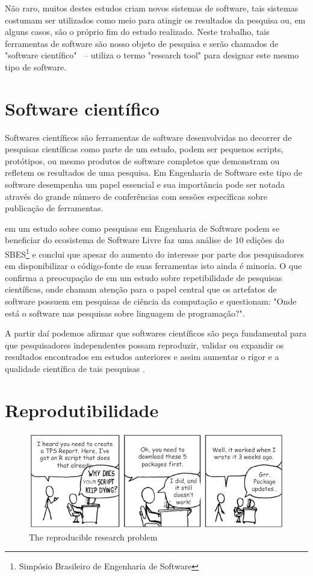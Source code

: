 \documentclass[qual, classic, a4paper]{ufbathesis}
\begin{document}
Não raro, muitos destes estudos criam novos sistemas de software, tais
sistemas costumam ser utilizados como meio para atingir os resultados da
pesquisa ou, em alguns casos, são o próprio fim do estudo realizado. Neste
trabalho, tais ferramentas de software são nosso objeto de pesquisa e serão
chamados de "software científico" \ --  utiliza o termo
"research tool" para designar este mesmo tipo de software.

\section{Software científico}

Softwares científicos são ferramentas de software desenvolvidas no decorrer de
pesquisas científicas como parte de um estudo, podem ser pequenos scripts,
protótipos, ou mesmo produtos de software completos que demonstram ou refletem
os resultados de uma pesquisa. Em Engenharia de Software este tipo de software
desempenha um papel essencial e sua importância pode ser notada através do
grande número de conferências com sessões específicas sobre publicação de
ferramentas.

 em um estudo sobre como pesquisas em Engenharia de
Software podem se beneficiar do ecosistema de Software Livre faz uma análise
de 10 edições do SBES\footnote{Simpósio Brasileiro de Engenharia de Software}
e conclui que apesar do aumento do interesse por parte dos pesquisadores em
disponibilizar o código-fonte de suas ferramentas isto ainda é minoria. O
que confirma a preocupação de  em um estudo
sobre repetibilidade de pesquisas científicas, onde chamam atenção para o papel
central que os artefatos de software possuem em pesquisas de ciência da
computação e questionam: "Onde está o software nas pesquisas sobre linguagem
de programação?".

A partir daí podemos afirmar que softwares científicos são peça fundamental
para que pesquisadores independentes possam reproduzir, validar ou expandir os
resultados encontrados em estudos anteriores e assim aumentar o rigor e a
qualidade científica de tais pesquisas \cite{Vitek2011}.

\section{Reprodutibilidade}

\begin{figure}[h]
  \center
  \includegraphics[scale=0.5]{imagens/reproducible-r-toolkit-cartoon.png}
  \caption{The reproducible research problem\cite{RevolutionanalyticsComRRT}}
  \label{reproducible-r-toolkit-cartoon}
\end{figure}
\end{document}
